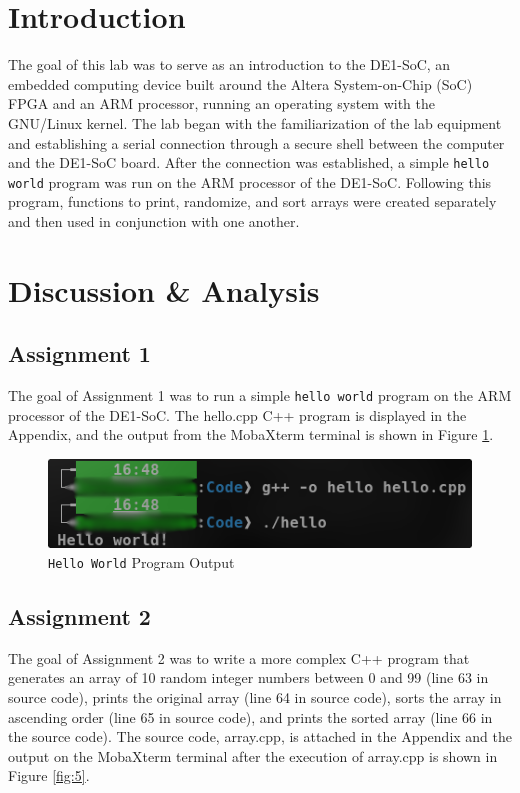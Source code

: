 \documentclass[
	letterpaper, %
	10pt, %
]{CSUniSchoolLabReport}
\begin{document}
\section{Introduction}

\hspace{.5 in} The goal of this lab was to serve as an introduction to the DE1-SoC, an embedded computing device built around the Altera System-on-Chip (SoC) FPGA and an ARM processor, running an operating system with the GNU/Linux kernel. The lab began with the familiarization of the lab equipment and establishing a serial connection through a secure shell between the computer and the DE1-SoC board. After the connection was established, a simple \texttt{hello world} program was run on the ARM processor of the DE1-SoC. Following this program, functions to print, randomize, and sort arrays were created separately and then used in conjunction with one another. 

\section{Discussion \& Analysis} 

\subsection{Assignment 1}

The goal of Assignment 1 was to run a simple \texttt{hello world} program on the ARM processor of the DE1-SoC. The hello.cpp C++ program is displayed in the Appendix, and the output from the MobaXterm terminal is shown in Figure \ref{fig:4}. 

\begin{figure}[H]
  \centering
  \includegraphics[width=.9\textwidth]{Figures/Assignment1.png}
  \caption{\texttt{Hello World} Program Output}
  \label{fig:4}
\end{figure}

\subsection{Assignment 2}

\hspace{.5 in} The goal of Assignment 2 was to write a more complex C++ program that generates an array of 10 random integer numbers between 0 and 99 (line 63 in source code), prints the original array (line 64 in source code), sorts the array in ascending order (line 65 in source code), and prints the sorted array (line 66 in the source code). The source code, array.cpp, is attached in the Appendix and the output on the MobaXterm terminal after the execution of array.cpp is shown in Figure \ref{fig:5}.
\end{document}
